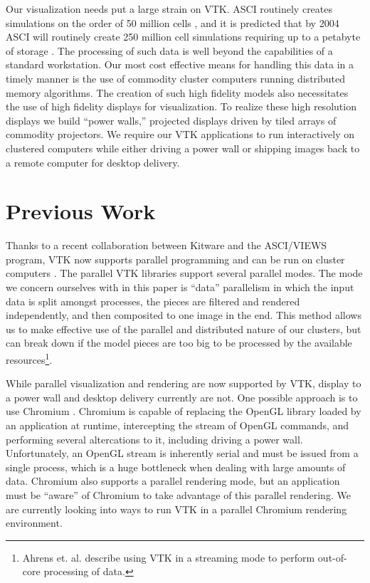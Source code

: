 \documentclass[twocolumn]{article}
\begin{document}
Our visualization needs put a large strain on VTK.  ASCI routinely creates
simulations on the order of 50 million cells \cite{Heermann99}, and it is
predicted that by 2004 ASCI will routinely create 250 million cell
simulations requiring up to a petabyte of storage \cite{Smith98}.  The
processing of such data is well beyond the capabilities of a standard
workstation.  Our most cost effective means for handling this data in a
timely manner is the use of commodity cluster computers running distributed
memory algorithms.  The creation of such high fidelity models also
necessitates the use of high fidelity displays for visualization.  To
realize these high resolution displays we build ``power walls,'' projected
displays driven by tiled arrays of commodity projectors.  We require our
VTK applications to run interactively on clustered computers while either
driving a power wall or shipping images back to a remote computer for
desktop delivery.


\section{Previous Work}
\label{sec:previous_work}

Thanks to a recent collaboration between Kitware and the ASCI/VIEWS
program, VTK now supports parallel programming and can be run on cluster
computers \cite{Ahrens00}.  The parallel VTK libraries support several
parallel modes.  The mode we concern ourselves with in this paper is
``data'' parallelism in which the input data is split amongst processes,
the pieces are filtered and rendered independently, and then composited to
one image in the end.  This method allows us to make effective use of the
parallel and distributed nature of our clusters, but can break down if the
model pieces are too big to be processed by the available
resources\footnote{Ahrens et. al. \cite{Ahrens01} describe using VTK in a
streaming mode to perform out-of-core processing of data.}.

While parallel visualization and rendering are now supported by VTK,
display to a power wall and desktop delivery currently are not.  One
possible approach is to use Chromium \cite{Humphreys02}.  Chromium is
capable of replacing the OpenGL library loaded by an application at
runtime, intercepting the stream of OpenGL commands, and performing several
altercations to it, including driving a power wall.  Unfortunately, an
OpenGL stream is inherently serial and must be issued from a single
process, which is a huge bottleneck when dealing with large amounts of
data.  Chromium also supports a parallel rendering mode, but an application
must be ``aware'' of Chromium to take advantage of this parallel rendering.
We are currently looking into ways to run VTK in a parallel Chromium
rendering environment.
\end{document}
